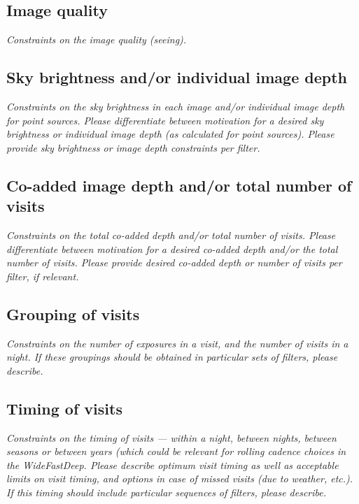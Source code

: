 \documentclass[11pt]{article}
\begin{document}
\subsection{Image quality}
\begin{footnotesize}{\it Constraints on the image quality (seeing).}\end{footnotesize}

\subsection{Sky brightness and/or individual image depth}
\begin{footnotesize}{\it Constraints on the sky brightness in each image and/or individual image depth for point sources.
Please differentiate between motivation for a desired sky brightness or individual image depth (as 
calculated for point sources). Please provide sky brightness or image depth constraints per filter.}
\end{footnotesize}

\subsection{Co-added image depth and/or total number of visits}
\begin{footnotesize}{\it  Constraints on the total co-added depth and/or total number of visits.
Please differentiate between motivation for a desired co-added depth and/or the total number of visits.
Please provide desired co-added depth or number of visits per filter, if relevant.}
\end{footnotesize}

\subsection{Grouping of visits}
\begin{footnotesize}{\it Constraints on the number of exposures in a visit, and the number of visits in a night. 
If these groupings should be obtained in particular sets of filters, please describe.}\end{footnotesize}

\subsection{Timing of visits}
\begin{footnotesize}{\it Constraints on the timing of visits --- within a night, between nights, between seasons or
between years (which could be relevant for rolling cadence choices in the WideFastDeep. 
Please describe optimum visit timing as well as acceptable limits on visit timing, and options in
case of missed visits (due to weather, etc.). If this timing should include particular sequences
of filters, please describe.}\end{footnotesize}
\end{document}
